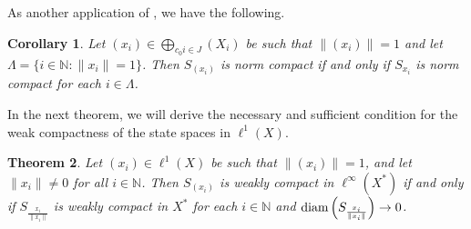 \documentclass[12pt]{amsart}
\newtheorem{theorem}{Theorem}[section]
\newtheorem{corollary}[theorem]{Corollary}
\theoremstyle{definition}
\numberwithin{equation}{section}
\begin{document}
As another application of \cite[Theorem~3.20.$(a)$]{RW}, we have the following.
\begin{corollary}
    Let $(x_i) \in \bigoplus_{c_{0}{i\in J}}(X_{i})$ be such that $\| (x_i) \| = 1$ and let $\Lambda = \{ i \in \mathbb{N} : \| x_i \| = 1 \}$. Then $ S_{(x_i)} $ is norm compact if and only if $ S_{x_i} $ is norm compact for each $i\in\Lambda$.
\end{corollary}
 In the next theorem, we will derive the necessary and sufficient condition for the weak compactness of the state spaces in $\ell^1(X)$.
\begin{theorem}\label{3t12}
    Let $ (x_i) \in {\ell^{1}}(X)$ be such that $ \| (x_i) \| = 1 $, and let $ \|x_{i}\|\neq 0$ for all $i\in{\mathbb{N}}$. Then $ S_{(x_i)}$ is weakly compact in $ {{\ell^{\infty}}}(X_{}^*) $ if and only if $ S_{\frac{x_i}{\|x_i\|}} $ is weakly compact in $X^*$ for each $i\in{\mathbb{N}}$ and $\textup{diam}\left(S_{\frac{x_i}{\|x_i\|}}\right) \to 0 $.
\end{theorem}
\end{document}
